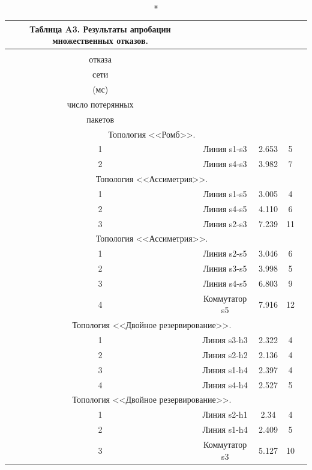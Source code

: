 \documentclass[12pt, a4paper]{article}
\begin{document}
\begin{longtable}[h]{|c|c|c|c|c|}
	\caption*{Таблица A3. Результаты апробации множественных отказов.}
	\\
	\hline
	\begin{tabular}[c]{@{}c@{}}Номер \\ отказа\end{tabular} & \begin{tabular}[c]{@{}c@{}}Отказавший элемент \\ сети\end{tabular} & \begin{tabular}[c]{@{}c@{}}Время реконфигурации \\ (мс)\end{tabular} & \begin{tabular}[c]{@{}c@{}}Максимальное\\ число потерянных\\ пакетов\end{tabular} \\ \hline
	\endfirsthead
	\endhead
	\multicolumn{4}{|c|}{Топология <<Ромб>>.} \\ \hline
	1 & Линия s1-s3 & 2.653 & 5 \\ \hline
	2 & Линия s4-s3 & 3.982 & 7 \\ \hline
	\multicolumn{4}{|c|}{Топология <<Ассиметрия>>.} \\ \hline
	1 & Линия s1-s5 & 3.005 & 4 \\ \hline
	2 & Линия s4-s5 & 4.110 & 6 \\ \hline
	3 & Линия s2-s3 & 7.239 & 11 \\ \hline
	\multicolumn{4}{|c|}{Топология <<Ассиметрия>>.} \\ \hline
	1 & Линия s2-s5 & 3.046 & 6 \\ \hline
	2 & Линия s3-s5 & 3.998 & 5 \\ \hline
	3 & Линия s4-s5 & 6.803 & 9 \\ \hline
	4 & Коммутатор s5 & 7.916 & 12 \\ \hline
	\multicolumn{4}{|c|}{Топология <<Двойное резервирование>>.} \\ \hline
	1 & Линия s3-h3 & 2.322 & 4 \\ \hline
	2 & Линия s2-h2 & 2.136 & 4 \\ \hline
	3 & Линия s1-h4 & 2.397 & 4\\ \hline
	4 & Линия s4-h4 & 2.527 & 5\\ \hline
	\multicolumn{4}{|c|}{Топология <<Двойное резервирование>>.} \\ \hline
	1 & Линия s2-h1 & 2.34 & 4 \\ \hline
	2 & Линия s1-h4 & 2.409 & 5\\ \hline
	3 & Коммутатор s3 & 5.127 & 10\\ \hline
	
\end{longtable}
\end{document}

